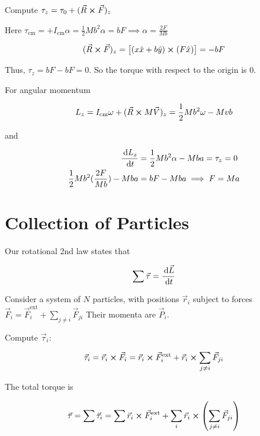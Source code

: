 \begin{sol}
	Compute $\tau_z = \tau_0 + (\vec R \cross \vec F)_z$

	Here $\tau_\mathrm{cm} = + I_\mathrm{cm} \alpha  = \frac{1}{2} Mb^2 \alpha = bF \implies \alpha = \frac{2F}{Mb}$

	\begin{equation}
		(\vec R \cross \vec F)_z = \left[(x \hat x + b \hat y) \cross (F \hat x)\right] = -bF
	\end{equation}

	Thus, $\tau_z = bF - bF = 0$. So the torque with respect to the origin is 0.

	For angular momentum

	\begin{equation}
		L_z = I_\mathrm{cm} \omega + (\vec R \cross M \vec V)_z = \frac{1}{2} Mb^2 \omega - Mvb
	\end{equation}

	and

	\begin{align}
		\frac{\D L_z}{\D t} &= \frac{1}{2} Mb^2 \alpha - Mba = \tau_z = 0\\
		\frac{1}{2} Mb^2 (\frac{2F}{Mb}) - Mba &= bF - Mba \implies F = Ma
	\end{align}
\end{sol}

\section{Collection of Particles}

Our rotational 2nd law states that

\begin{equation}
	\sum \vec \tau = \frac{\D \vec L}{\D t}
\end{equation}

Consider a system of $N$ particles, with positions $\vec r_i$ subject to forces $\vec F_i = \vec F_i^\mathrm{ext} + \sum_{j\neq i} \vec F_{ji}$ Their momenta are $\vec P_i$.

Compute $\vec\tau_i$:

\begin{equation}
	\vec\tau_i = \vec r_i \cross \vec F_i = \vec r_i \cross \vec F_i^\mathrm{ext} + \vec r_i \cross \sum_{j\neq i} \vec F_{ji}
\end{equation}

The total torque is

\begin{equation}
	\vec\tau = \sum\vec\tau_i = \sum \vec r_i \cross \vec F_i^\mathrm{ext} + \sum_i \vec r_i \cross \left(\sum_{j\neq i} \vec F_{ji}\right)
\end{equation}

